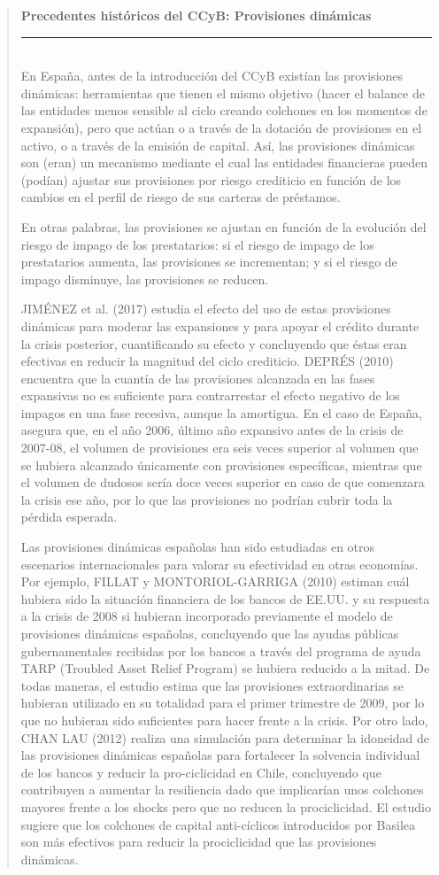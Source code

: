 \documentclass[10pt,a4paper]{article}
\newenvironment{specialblock}[1]{%
      \begin{quote} %
      \small %
      \noindent\textbf{#1}\\[-0.3em] %
      \rule{\linewidth}{0.4pt}\\[0.6em]}{
      \end{quote}}
\begin{document}
\begin{specialblock}{Precedentes históricos del CCyB: Provisiones dinámicas}
    En España, antes de la introducción del CCyB existían las provisiones dinámicas: herramientas que tienen el mismo objetivo (hacer el balance de las entidades menos sensible al ciclo creando colchones en los momentos de expansión), pero que actúan o a través de la dotación de provisiones en el activo, o a través de la emisión de capital. Así, las provisiones dinámicas son (eran) un mecanismo mediante el cual las entidades financieras pueden (podían) ajustar sus provisiones por riesgo crediticio en función de los cambios en el perfil de riesgo de sus carteras de préstamos. 
    
    En otras palabras, las provisiones se ajustan en función de la evolución del riesgo de impago de los prestatarios: si el riesgo de impago de los prestatarios aumenta, las provisiones se incrementan; y si el riesgo de impago disminuye, las provisiones se reducen. 
    
    JIMÉNEZ et al. (2017) estudia el efecto del uso de estas provisiones dinámicas para moderar las expansiones y para apoyar el crédito durante la crisis posterior, cuantificando su efecto y concluyendo que éstas eran efectivas en reducir la magnitud del ciclo crediticio. DEPRÉS (2010) encuentra que la cuantía de las provisiones alcanzada en las fases expansivas no es suficiente para contrarrestar el efecto negativo de los impagos en una fase recesiva, aunque la amortigua. En el caso de España, asegura que, en el año 2006, último año expansivo antes de la crisis de 2007-08, el volumen de provisiones era seis veces superior al volumen que se hubiera alcanzado únicamente con provisiones específicas, mientras que el volumen de dudosos sería doce veces superior en caso de que comenzara la crisis ese año, por lo que las provisiones no podrían cubrir toda la pérdida esperada. 
    
    Las provisiones dinámicas españolas han sido estudiadas en otros escenarios internacionales para valorar su efectividad en otras economías. Por ejemplo, FILLAT y MONTORIOL-GARRIGA (2010) estiman cuál hubiera sido la situación financiera de los bancos de EE.UU. y su respuesta a la crisis de 2008 si hubieran incorporado previamente el modelo de provisiones dinámicas españolas, concluyendo que las ayudas públicas gubernamentales recibidas por los bancos a través del programa de ayuda TARP (Troubled Asset Relief Program) se hubiera reducido a la mitad. De todas maneras, el estudio estima que las provisiones extraordinarias se hubieran utilizado en su totalidad para el primer trimestre de 2009, por lo que no hubieran sido suficientes para hacer frente a la crisis. Por otro lado, CHAN LAU (2012) realiza una simulación para determinar la idoneidad de las provisiones dinámicas españolas para fortalecer la solvencia individual de los bancos y reducir la pro-ciclicidad en Chile, concluyendo que contribuyen a aumentar la resiliencia dado que implicarían unos colchones mayores frente a los shocks pero que no reducen la prociclicidad. El estudio sugiere que los colchones de capital anti-cíclicos introducidos por Basilea son más efectivos para reducir la prociclicidad que las provisiones dinámicas.
\end{specialblock}
\end{document}
